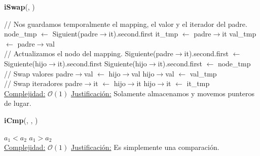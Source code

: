 \begin{Algoritmos}
    \begin{algorithm}
    \caption{\textbf{iSwap}(, )}
    \begin{algorithmic}
        \State // Nos guardamos temporalmente el mapping, el valor y el iterador del padre.
        \State node\_tmp $\gets$ Siguient(padre$\to$it).second.first  
        \State it\_tmp $\gets$ padre$\to$it  
        \State val\_tmp $\gets$ padre$\to$val  
        \\
        \State // Actualizamos el nodo del mapping.
        \State Siguiente(padre$\to$it).second.first $\gets$ Siguiente(hijo$\to$it).second.first  
        \State Siguiente(hijo$\to$it).second.first $\gets$ node\_tmp  
        \\
        \State // Swap valores
        \State padre$\to$val $\gets$ hijo$\to$val  
        \State hijo$\to$val $\gets$ val\_tmp  
        \\
        \State // Swap iteradores
        \State padre$\to$it $\gets$ hijo$\to$it  
        \State hijo$\to$it $\gets$ it\_tmp  
        \\
        \Statex \underline{Complejidad:} $\mathcal{O}(1)$
        \Statex \underline{Justificación:} Solamente almacenamos y movemos punteros de lugar.
    \end{algorithmic}
    \end{algorithm}

    \begin{algorithm}
    \caption{\textbf{iCmp}(, , )}
    \begin{algorithmic}
            \State \Return $a_1 < a_2$
        \EndIf
        \State \Return $a_1 > a_2$
        \\
        \Statex \underline{Complejidad:} $\mathcal{O}(1)$
        \Statex \underline{Justificación:} Es simplemente una comparación.
    \end{algorithmic}
    \end{algorithm}

\end{Algoritmos}